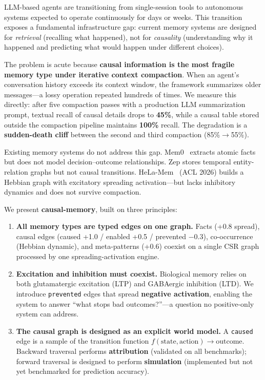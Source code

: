\documentclass[letterpaper,twocolumn,10pt]{article}
\begin{document}
LLM-based agents are transitioning from single-session tools to autonomous systems expected to operate continuously for days or weeks. This transition exposes a fundamental infrastructure gap: current memory systems are designed for \emph{retrieval} (recalling what happened), not for \emph{causality} (understanding why it happened and predicting what would happen under different choices).

The problem is acute because \textbf{causal information is the most fragile memory type under iterative context compaction}. When an agent's conversation history exceeds its context window, the framework summarizes older messages---a lossy operation repeated hundreds of times. We measure this directly: after five compaction passes with a production LLM summarization prompt, textual recall of causal details drops to \textbf{45\%}, while a causal table stored outside the compaction pipeline maintains \textbf{100\%} recall. The degradation is a \textbf{sudden-death cliff} between the second and third compaction (85\%$\rightarrow$55\%).

Existing memory systems do not address this gap. Mem0~\cite{mem0} extracts atomic facts but does not model decision--outcome relationships. Zep stores temporal entity-relation graphs but not causal transitions. HeLa-Mem~\cite{helamem} (ACL 2026) builds a Hebbian graph with excitatory spreading activation---but lacks inhibitory dynamics and does not survive compaction.

We present \textbf{causal-memory}, built on three principles:

\begin{enumerate}[leftmargin=*,itemsep=2pt]
\item \textbf{All memory types are typed edges on one graph.} Facts (+0.8 spread), causal edges (caused +1.0 / enabled +0.5 / prevented $-$0.3), co-occurrence (Hebbian dynamic), and meta-patterns (+0.6) coexist on a single CSR graph processed by one spreading-activation engine.

\item \textbf{Excitation and inhibition must coexist.} Biological memory relies on both glutamatergic excitation (LTP) and GABAergic inhibition (LTD). We introduce \texttt{prevented} edges that spread \textbf{negative activation}, enabling the system to answer ``what stops bad outcomes?''---a question no positive-only system can address.

\item \textbf{The causal graph is designed as an explicit world model.} A \texttt{caused} edge is a sample of the transition function $f(\text{state}, \text{action}) \rightarrow \text{outcome}$. Backward traversal performs \textbf{attribution} (validated on all benchmarks); forward traversal is designed to perform \textbf{simulation} (implemented but not yet benchmarked for prediction accuracy).
\end{enumerate}
\end{document}
